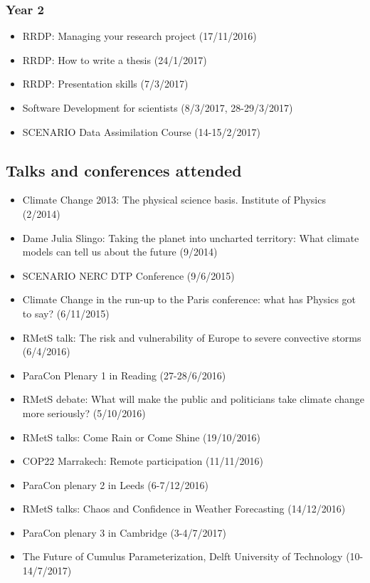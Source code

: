 \documentclass[11pt,a4paper]{article}
\begin{document}
\subsubsection*{Year 2}

\begin{itemize}
  \item RRDP: Managing your research project (17/11/2016)
  \item RRDP: How to write a thesis (24/1/2017)
  \item RRDP: Presentation skills (7/3/2017)
  \item Software Development for scientists (8/3/2017, 28-29/3/2017)
  \item SCENARIO Data Assimilation Course (14-15/2/2017)
\end{itemize}

\subsection*{Talks and conferences attended}

\begin{itemize}
  \item Climate Change 2013: The physical science basis. Institute of Physics (2/2014)
  \item Dame Julia Slingo: Taking the planet into uncharted territory: What climate models can tell us about the future (9/2014)
  \item SCENARIO NERC DTP Conference (9/6/2015)
  \item Climate Change in the run-up to the Paris conference: what has Physics got to say? (6/11/2015)
  \item RMetS talk: The risk and vulnerability of Europe to severe convective storms (6/4/2016)
  \item ParaCon Plenary 1 in Reading (27-28/6/2016)
  \item RMetS debate: What will make the public and politicians take climate change more seriously? (5/10/2016)
  \item RMetS talks: Come Rain or Come Shine (19/10/2016)
  \item COP22 Marrakech: Remote participation (11/11/2016)
  \item ParaCon plenary 2 in Leeds (6-7/12/2016)
  \item RMetS talks: Chaos and Confidence in Weather Forecasting (14/12/2016)
  \item ParaCon plenary 3 in Cambridge (3-4/7/2017)
  \item The Future of Cumulus Parameterization, Delft University of Technology (10-14/7/2017)
\end{itemize}
\end{document}
